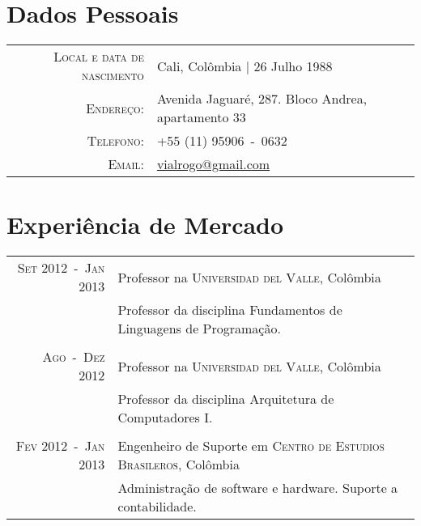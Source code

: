 \documentclass[a4paper,10pt]{article}
\begin{document}
\pagestyle{empty} %

\par{\bigskip\par}

\section{Dados Pessoais}

\begin{tabular}{rl}
  \textsc{Local e data de nascimento} & Cali, Colômbia  | 26 Julho 1988 \\
  \textsc{Endereço:}                  & Avenida Jaguaré, 287. Bloco Andrea, apartamento 33 \\
  \textsc{Telefono:}                  & +55 (11) 95906~-~0632 \\
  \textsc{Email:}                     & \href{mailto:vialrogo@gmail.com}{vialrogo@gmail.com} \\
\end{tabular}

\section{Experiência de Mercado}
\begin{tabular}{rl}

  \textsc{Set 2012~-~Jan 2013}  & Professor na \textsc{Universidad del Valle}, Colômbia \\
                                &\footnotesize{Professor da disciplina Fundamentos de Linguagens de Programação.} \\
                                &\\

  \textsc{Ago~-~Dez 2012}       & Professor na \textsc{Universidad del Valle}, Colômbia \\
                                &\footnotesize{Professor da disciplina Arquitetura de Computadores I.} \\
                                &\\

  \textsc{Fev 2012~-~Jan 2013}  & Engenheiro de Suporte em \textsc{Centro de Estudios Brasileros}, Colômbia \\
                                &\footnotesize{Administração de software e hardware. Suporte a contabilidade.} \\

\end{tabular}
\end{document}
